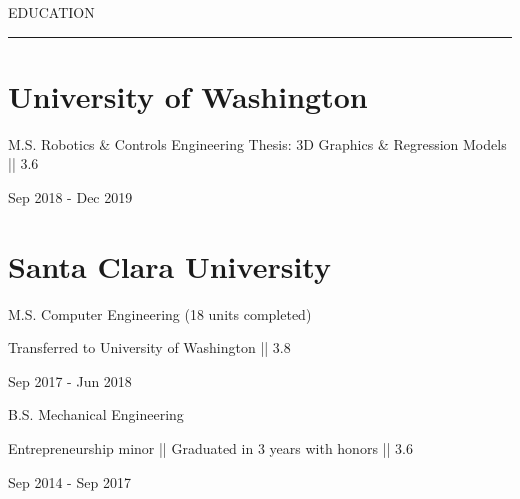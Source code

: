 \documentclass[letterpaper,10pt,oneside]{article}
\begin{document}
\begin{body}


\vspace{2ex}

{\color{cblue}
{EDUCATION} %
}

\vspace{-4.4ex}
\hspace{-1.25in}\noindent\color{dblue}\rule{6.935in}{0.4pt} 
\vspace{-5.5ex}

\section
{\textbf{University of Washington}}{}

{\small M.S. Robotics \& Controls Engineering}
\BulletItem
{\small Thesis: 3D Graphics \& Regression Models || 3.6}

\begin{subtitle}
\vspace{-8ex}
{{Sep 2018 - Dec 2019}}
\end{subtitle}

\vspace{-1ex}


\section
{\textbf{Santa Clara University}}{}{}

{{\small M.S. Computer Engineering (18 units completed)}}
\begin{detail}
\BulletItem
Transferred to University of Washington || 3.8
\end{detail}

\begin{subtitle}
\vspace{-8ex}
{{Sep 2017 - Jun 2018}}
\end{subtitle}
\vspace{1ex}
    

{{\small B.S. Mechanical Engineering}}
\begin{detail}
\BulletItem
Entrepreneurship minor || Graduated in 3 years with honors || 3.6
\end{detail}

\begin{subtitle}
\vspace{-8ex}
{{Sep 2014 - Sep 2017}}
\end{subtitle}
\vspace{1ex}



\end{body}
\end{document}
